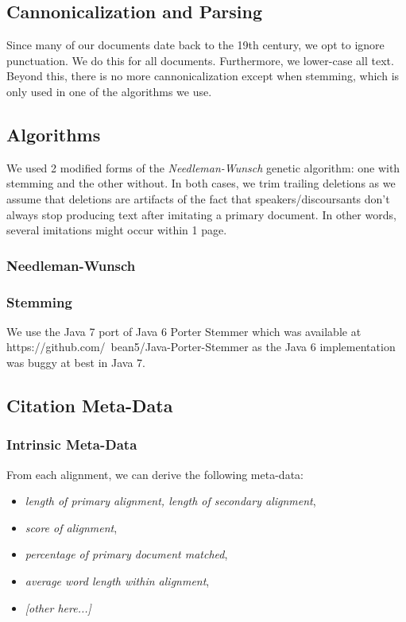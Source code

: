 \subsection{Cannonicalization and Parsing}
Since many of our documents date back to the 19th century, we opt to ignore punctuation. We do this for all documents. Furthermore, we lower-case all text. Beyond this, there is no more cannonicalization except when stemming, which is only used in one of the algorithms we use.

\subsection{Algorithms}
We used 2 modified forms of the \textit{Needleman-Wunsch} genetic algorithm: one with stemming and the other without. In both cases, we trim trailing deletions as we assume that deletions are artifacts of the fact that speakers/discoursants don't always stop producing text after imitating a primary document. In other words, several imitations might occur within 1 page.

\subsubsection{Needleman-Wunsch}

\subsubsection{Stemming}
We use the Java 7 port of Java 6 Porter Stemmer which was available at https://github.com/~bean5/Java-Porter-Stemmer as the Java 6 implementation was buggy at best in Java 7.



\subsection{Citation Meta-Data}

\subsubsection{Intrinsic Meta-Data}
From each alignment, we can derive the following meta-data:
	\begin{itemize}
		\item \textit{length of primary alignment, length of secondary alignment},
		\item \textit{score of alignment},
		\item \textit{percentage of primary document matched},
		\item \textit{average word length within alignment},
		\item \textit{[other here...]}
	\end{itemize}

